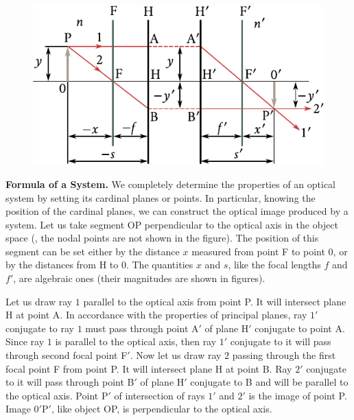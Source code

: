 \begin{figure}[t]
	\begin{center}
		\includegraphics[scale=1]{figures/ch_16/fig_16_18.pdf}
        \caption[]{}
		\label{fig:16_18}
	\end{center}
	\vspace{-0.8cm}
\end{figure}

\textbf{Formula of a System.}
We completely determine the properties of an optical system by setting its cardinal planes or points.
In particular, knowing the position of the cardinal planes, we can construct the optical image produced by a system.
Let us take segment OP perpendicular to the optical axis in the object space (, the nodal points are not shown in the figure). The position of this segment can be set either by the distance $x$ measured from point F to point $0$, or by the distances from H to $0$.
The quantities $x$ and $s$, like the focal lengths $f$ and $f'$, are algebraic ones (their magnitudes are shown in figures).

Let us draw ray $1$ parallel to the optical axis from point P.
It will intersect plane H at point A.
In accordance with the properties of principal planes, ray $1'$ conjugate to ray $1$ must pass through point A$'$ of plane H$'$ conjugate to point A.
Since ray $1$ is parallel to the optical axis, then ray $1'$ conjugate to it will pass through second focal point F$'$.
Now let us draw ray $2$ passing through the first focal point F from point P.
It will intersect plane H at point B.
Ray $2'$ conjugate to it will pass through point B$'$ of plane H$'$ conjugate to B and will be parallel to the optical axis.
Point P$'$ of intersection of rays $1'$ and $2'$
is the image of point P.
Image $0'$P$'$, like object OP, is perpendicular
to the optical axis.

